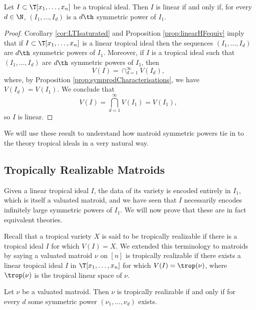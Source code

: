 \begin{corollary}\label{cor:hfSymprodEquiv}
Let $I\subset \T[x_1,\dots,x_n]$ be a tropical ideal. Then $I$ is linear if and only if, for every $d\in \N$, $(I_1,\dots,I_d)$ is a $d\th$ symmetric power of $I_1$. 
\end{corollary}
\begin{proof}
    Corollary \ref{cor:LTIsaturated} and Proposition \ref{prop:linearHFequiv} imply that if $I\subset \T[x_1,\dots,x_n]$ is a linear tropical ideal then the sequences $(I_1,\dots,I_d)$ are $d\th$ symmetric powers of $I_1$. Moreover, if $I$ is a tropical ideal such that $(I_1,\dots,I_d)$ are $d\th$ symmetric powers of $I_1$, then 
    $$V(I) = \cap_{d=1}^\infty V(I_d),$$
    where, by Proposition \ref{prop:symprodCharacterisations}, we have $V(I_d)=V(I_1)$. We conclude that
    $$V(I)=\bigcap_{d=1}^\infty V(I_1) = V(I_1),$$
    so $I$ is linear.
\end{proof}

 We will use these result to understand how matroid symmetric powers tie in to the theory tropical ideals in a very natural way.

\subsection{Tropically Realizable Matroids}\label{subsec:TropRealizableMatroids}

Given a linear tropical ideal $I$, the data of its variety is encoded entirely in $I_1$, which is itself a valuated matroid, and we have seen that $I$ necessarily encodes infinitely large symmetric powers of $I_1$. We will now prove that these are in fact equivalent theories.

Recall that a tropical variety $X$ is said to be tropically realizable if there is a tropical ideal $I$ for which $V(I)= X$. We extended this terminology to matroids by saying a valuated matroid $\nu$ on $[n]$ is tropically realizable if there exists a linear tropical ideal $I$ in $\T[x_1,\dots,x_n]$ for which $V(I)=\trop(\nu)$, where $\trop(\nu)$ is the tropical linear space of $\nu$.

\begin{theorem}\label{thm:linearMatroidCorres}
Let $\nu$ be a valuated matroid. Then $\nu$ is tropically realizable if and only if for every $d$ some symmetric power $(\nu_1,\dots,\nu_d)$ exists.
\end{theorem}

